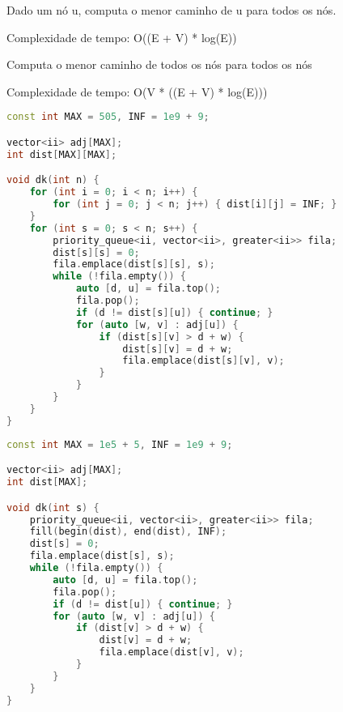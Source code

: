 \documentclass[11pt, a4paper, twoside]{book}
\begin{document}
Dado um nó u, computa o menor caminho de u para todos os nós.



Complexidade de tempo: O((E + V) * log(E))



\textbf{} 


Computa o menor caminho de todos os nós para todos os nós



Complexidade de tempo: O(V * ((E + V) * log(E)))


\hfill

\begin{lstlisting}[language=C++]
const int MAX = 505, INF = 1e9 + 9;

vector<ii> adj[MAX];
int dist[MAX][MAX];

void dk(int n) {
    for (int i = 0; i < n; i++) {
        for (int j = 0; j < n; j++) { dist[i][j] = INF; }
    }
    for (int s = 0; s < n; s++) {
        priority_queue<ii, vector<ii>, greater<ii>> fila;
        dist[s][s] = 0;
        fila.emplace(dist[s][s], s);
        while (!fila.empty()) {
            auto [d, u] = fila.top();
            fila.pop();
            if (d != dist[s][u]) { continue; }
            for (auto [w, v] : adj[u]) {
                if (dist[s][v] > d + w) {
                    dist[s][v] = d + w;
                    fila.emplace(dist[s][v], v);
                }
            }
        }
    }
}
\end{lstlisting}

\hfill

\begin{multicols}{2}
\begin{lstlisting}[language=C++]
const int MAX = 1e5 + 5, INF = 1e9 + 9;

vector<ii> adj[MAX];
int dist[MAX];

void dk(int s) {
    priority_queue<ii, vector<ii>, greater<ii>> fila;
    fill(begin(dist), end(dist), INF);
    dist[s] = 0;
    fila.emplace(dist[s], s);
    while (!fila.empty()) {
        auto [d, u] = fila.top();
        fila.pop();
        if (d != dist[u]) { continue; }
        for (auto [w, v] : adj[u]) {
            if (dist[v] > d + w) {
                dist[v] = d + w;
                fila.emplace(dist[v], v);
            }
        }
    }
}
\end{lstlisting}
\end{multicols}

\hfill
\end{document}
